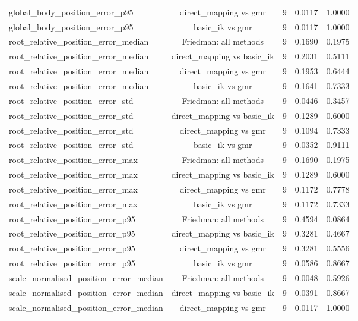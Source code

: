\begin{table}[t]
{\begin{tabular}{lcccc}
global\_body\_position\_error\_p95 & direct\_mapping vs gmr & 9 & 0.0117 & 1.0000 \\
global\_body\_position\_error\_p95 & basic\_ik vs gmr & 9 & 0.0117 & 1.0000 \\
root\_relative\_position\_error\_median & Friedman: all methods & 9 & 0.1690 & 0.1975 \\
root\_relative\_position\_error\_median & direct\_mapping vs basic\_ik & 9 & 0.2031 & 0.5111 \\
root\_relative\_position\_error\_median & direct\_mapping vs gmr & 9 & 0.1953 & 0.6444 \\
root\_relative\_position\_error\_median & basic\_ik vs gmr & 9 & 0.1641 & 0.7333 \\
root\_relative\_position\_error\_std & Friedman: all methods & 9 & 0.0446 & 0.3457 \\
root\_relative\_position\_error\_std & direct\_mapping vs basic\_ik & 9 & 0.1289 & 0.6000 \\
root\_relative\_position\_error\_std & direct\_mapping vs gmr & 9 & 0.1094 & 0.7333 \\
root\_relative\_position\_error\_std & basic\_ik vs gmr & 9 & 0.0352 & 0.9111 \\
root\_relative\_position\_error\_max & Friedman: all methods & 9 & 0.1690 & 0.1975 \\
root\_relative\_position\_error\_max & direct\_mapping vs basic\_ik & 9 & 0.1289 & 0.6000 \\
root\_relative\_position\_error\_max & direct\_mapping vs gmr & 9 & 0.1172 & 0.7778 \\
root\_relative\_position\_error\_max & basic\_ik vs gmr & 9 & 0.1172 & 0.7333 \\
root\_relative\_position\_error\_p95 & Friedman: all methods & 9 & 0.4594 & 0.0864 \\
root\_relative\_position\_error\_p95 & direct\_mapping vs basic\_ik & 9 & 0.3281 & 0.4667 \\
root\_relative\_position\_error\_p95 & direct\_mapping vs gmr & 9 & 0.3281 & 0.5556 \\
root\_relative\_position\_error\_p95 & basic\_ik vs gmr & 9 & 0.0586 & 0.8667 \\
scale\_normalised\_position\_error\_median & Friedman: all methods & 9 & 0.0048 & 0.5926 \\
scale\_normalised\_position\_error\_median & direct\_mapping vs basic\_ik & 9 & 0.0391 & 0.8667 \\
scale\_normalised\_position\_error\_median & direct\_mapping vs gmr & 9 & 0.0117 & 1.0000 \\

\end{tabular}}
\end{table}
